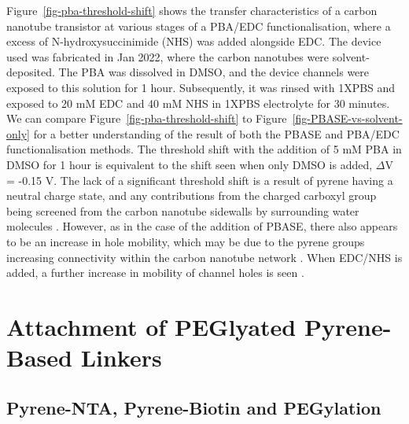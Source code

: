 \documentclass[
  a4paper,
]{scrbook}
\begin{document}
Figure~\ref{fig-pba-threshold-shift} shows the transfer characteristics
of a carbon nanotube transistor at various stages of a PBA/EDC
functionalisation, where a excess of N-hydroxysuccinimide (NHS) was
added alongside EDC. The device used was fabricated in Jan 2022, where
the carbon nanotubes were solvent-deposited. The PBA was dissolved in
DMSO, and the device channels were exposed to this solution for 1 hour.
Subsequently, it was rinsed with 1XPBS and exposed to 20 mM EDC and 40
mM NHS in 1XPBS electrolyte for 30 minutes. We can compare
Figure~\ref{fig-pba-threshold-shift} to
Figure~\ref{fig-PBASE-vs-solvent-only} for a better understanding of the
result of both the PBASE and PBA/EDC functionalisation methods. The
threshold shift with the addition of 5 mM PBA in DMSO for 1 hour is
equivalent to the shift seen when only DMSO is added, \(\Delta\)V =
-0.15 V. The lack of a significant threshold shift is a result of pyrene
having a neutral charge state, and any contributions from the charged
carboxyl group being screened from the carbon nanotube sidewalls by
surrounding water molecules \autocite{Lerner2012}. However, as in the
case of the addition of PBASE, there also appears to be an increase in
hole mobility, which may be due to the pyrene groups increasing
connectivity within the carbon nanotube network
\autocite{Murugathas2019b}. When EDC/NHS is added, a further increase in
mobility of channel holes is seen \autocite{Heller2008}.

\hypertarget{attachment-of-peglyated-pyrene-based-linkers}{%
\section{Attachment of PEGlyated Pyrene-Based
Linkers}\label{attachment-of-peglyated-pyrene-based-linkers}}

\hypertarget{pyrene-nta-pyrene-biotin-and-pegylation}{%
\subsection{Pyrene-NTA, Pyrene-Biotin and
PEGylation}\label{pyrene-nta-pyrene-biotin-and-pegylation}}
\end{document}

